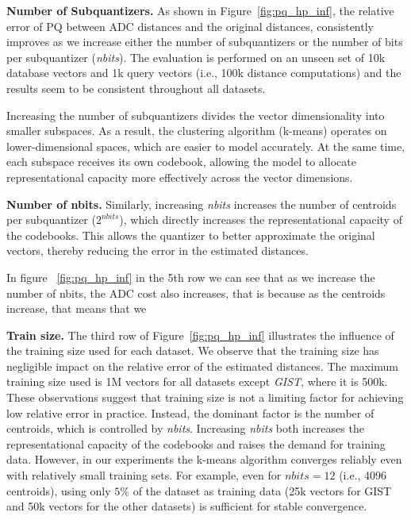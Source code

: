 \documentclass[sigconf]{acmart}
\begin{document}
\textbf{Number of Subquantizers.} As shown in Figure~\ref{fig:pq_hp_inf}, the relative error of PQ between ADC distances and the original distances, consistently improves as we increase either the number of subquantizers or the number of bits per subquantizer (\textit{nbits}).
The evaluation is performed on an unseen set of 10k database vectors and 1k query vectors (i.e., 100k distance computations) and the results seem to be consistent throughout all datasets.

Increasing the number of subquantizers divides the vector dimensionality into smaller subspaces. 
As a result, the clustering algorithm (k-means) operates on lower-dimensional spaces, which are easier to model accurately. 
At the same time, each subspace receives its own codebook, allowing the model to allocate representational capacity more effectively across the vector dimensions.

\textbf{Number of nbits.} Similarly, increasing \textit{nbits} increases the number of centroids per subquantizer ($2^{\textit{nbits}}$), which directly increases the representational capacity of the codebooks. 
This allows the quantizer to better approximate the original vectors, thereby reducing the error in the estimated distances.

In figure ~\ref{fig:pq_hp_inf} in the 5th row we can see that as we increase the number of nbits, the ADC cost also increases, that is because as the centroids increase, that means that we 

\textbf{Train size.} The third row of Figure~\ref{fig:pq_hp_inf} illustrates the influence of the training size used for each dataset. 
We observe that the training size has negligible impact on the relative error of the estimated distances. The maximum training size used is 1M vectors for all datasets except \textit{GIST}, where it is 500k.
These observations suggest that training size is not a limiting factor for achieving low relative error in practice.
Instead, the dominant factor is the number of centroids, which is controlled by \textit{nbits}. 
Increasing \textit{nbits} both increases the representational capacity of the codebooks and raises the demand for training data. 
However, in our experiments the k-means algorithm converges reliably even with relatively small training sets. 
For example, even for $\textit{nbits}=12$ (i.e., 4096 centroids), using only $5\%$ of the dataset as training data (25k vectors for GIST and 50k vectors for the other datasets) is sufficient for stable convergence.
\end{document}
